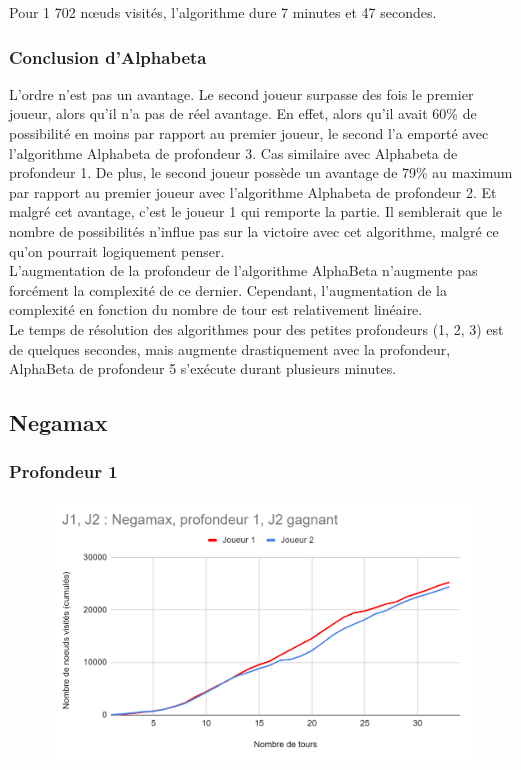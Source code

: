 \documentclass[12pt]{article}
\begin{document}
Pour 1 702 nœuds visités, l’algorithme dure 7 minutes et 47 secondes. 

\subsubsection{Conclusion d’Alphabeta}

L'ordre n'est pas un avantage.
Le second joueur surpasse des fois le premier joueur, alors qu'il n'a pas de réel avantage. En effet, alors qu'il avait 60\% de possibilité en moins par rapport au premier joueur, le second l'a emporté avec l'algorithme Alphabeta de profondeur 3. Cas similaire avec Alphabeta de profondeur 1.
De plus, le second joueur possède un avantage de 79\% au maximum par rapport au premier joueur avec l'algorithme Alphabeta de profondeur 2. Et malgré cet avantage, c'est le joueur 1 qui remporte la partie.
Il semblerait que le nombre de possibilités n'influe pas sur la victoire avec cet algorithme, malgré ce qu'on pourrait logiquement penser.\\

L’augmentation de la profondeur de l’algorithme AlphaBeta n’augmente pas forcément la complexité de ce dernier. Cependant, l’augmentation de la complexité en fonction du nombre de tour est relativement linéaire.\\
Le temps de résolution des algorithmes pour des petites profondeurs (1, 2, 3) est de quelques secondes, mais augmente drastiquement avec la profondeur, AlphaBeta de profondeur 5 s’exécute durant plusieurs minutes. 

\newpage
\subsection{Negamax}

\subsubsection{Profondeur 1}

\begin{figure}[!h]
   \includegraphics[width=\textwidth]{prof1negamax.png}
\end{figure}
\end{document}
